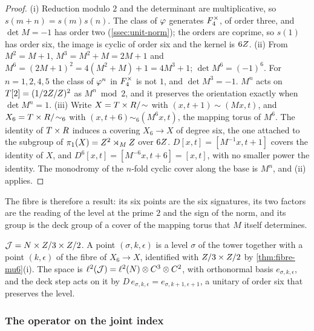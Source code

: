 \begin{proof}
(i) Reduction modulo $2$ and the determinant are multiplicative, so $s(m+n)=s(m)s(n)$.  The class of $\varphi$
generates $F_4^\times$, of order three, and $\det M=-1$ has order two (\cref{ssec:unit-norm}); the orders are
coprime, so $s(1)$ has order six, the image is cyclic of order six and the kernel is $6Z$.
(ii) From $M^2=M+1$, $M^3=M^2+M=2M+1$ and $M^6=(2M+1)^2=4(M^2+M)+1=4M^3+1$; $\det M^6=(-1)^6$.  For
$n=1,2,4,5$ the class of $\varphi^n$ in $F_4^\times$ is not $1$, and $\det M^3=-1$.  $M^n$ acts on
$T[2]=(1/2Z/Z)^2$ as $M^n\bmod2$, and it preserves the orientation exactly when $\det M^n=1$.
(iii) Write $X=T\times R/\!\sim$ with $(x,t+1)\sim(Mx,t)$, and $X_6=T\times R/\!\sim_6$ with
$(x,t+6)\sim_6(M^6x,t)$, the mapping torus of $M^6$.  The identity of $T\times R$ induces a covering
$X_6\to X$ of degree six, the one attached to the subgroup of $\pi_1(X)=Z^2\rtimes_MZ$ over $6Z$.
$D[x,t]=[M^{-1}x,t+1]$ covers the identity of $X$, and $D^6[x,t]=[M^{-6}x,t+6]=[x,t]$, with no smaller power the
identity.  The monodromy of the $n$-fold cyclic cover along the base is $M^n$, and \textup{(ii)} applies.
\end{proof}

The fibre is therefore a result: its six points are the six signatures, its two factors are the reading of the
level at the prime $2$ and the sign of the norm, and its group is the deck group of a cover of the mapping torus
that $M$ itself determines.

\begin{definition}\label{def:joint-index}
$\mathcal J=N\times Z/3\times Z/2$.  A point $(\sigma,k,\epsilon)$ is a level $\sigma$ of the tower together with a
point $(k,\epsilon)$ of the fibre of $X_6\to X$, identified with $Z/3\times Z/2$ by
\cref{thm:fibre-mu6}\textup{(i)}.  The space is $\ell^2(\mathcal J)=\ell^2(N)\otimes C^3\otimes C^2$, with
orthonormal basis $e_{\sigma,k,\epsilon}$, and the deck step acts on it by
$D\,e_{\sigma,k,\epsilon}=e_{\sigma,k+1,\epsilon+1}$, a unitary of order six that preserves the level.
\end{definition}

\subsubsection{The operator on the joint index}\label{ssec:the-operator}

